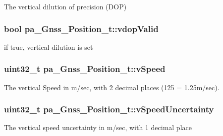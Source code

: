 The vertical dilution of precision (D\+OP) 

\subsubsection[{\texorpdfstring{vdop\+Valid}{vdopValid}}]{\setlength{\rightskip}{0pt plus 5cm}bool pa\+\_\+\+Gnss\+\_\+\+Position\+\_\+t\+::vdop\+Valid}\hypertarget{structpa___gnss___position__t_af63b4e99838258fceea9a3a08b7516f6}{}\label{structpa___gnss___position__t_af63b4e99838258fceea9a3a08b7516f6}


if true, vertical dilution is set 

\subsubsection[{\texorpdfstring{v\+Speed}{vSpeed}}]{\setlength{\rightskip}{0pt plus 5cm}uint32\+\_\+t pa\+\_\+\+Gnss\+\_\+\+Position\+\_\+t\+::v\+Speed}\hypertarget{structpa___gnss___position__t_a0b496fc87fd41bfbbdf7821febbea3f6}{}\label{structpa___gnss___position__t_a0b496fc87fd41bfbbdf7821febbea3f6}
The vertical Speed in m/sec, with 2 decimal places (125 = 1.\+25m/sec). 
\subsubsection[{\texorpdfstring{v\+Speed\+Uncertainty}{vSpeedUncertainty}}]{\setlength{\rightskip}{0pt plus 5cm}uint32\+\_\+t pa\+\_\+\+Gnss\+\_\+\+Position\+\_\+t\+::v\+Speed\+Uncertainty}\hypertarget{structpa___gnss___position__t_ab1d29a0add539d38bfa028a91da203b4}{}\label{structpa___gnss___position__t_ab1d29a0add539d38bfa028a91da203b4}
The vertical speed uncertainty in m/sec, with 1 decimal place 
